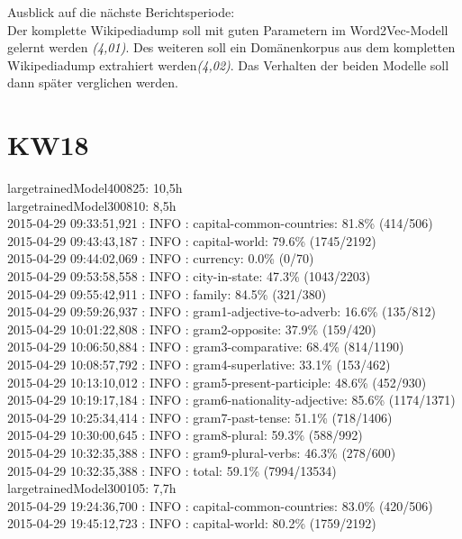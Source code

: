 \documentclass[11pt,a4paper]{article}
\begin{document}
Ausblick auf die nächste Berichtsperiode:
\\Der komplette Wikipediadump soll mit guten Parametern im Word2Vec-Modell gelernt werden \textit{(4,01)}. Des weiteren soll ein Domänenkorpus aus dem kompletten Wikipediadump extrahiert werden\textit{(4,02)}. Das Verhalten der beiden Modelle soll dann später verglichen werden.

\section*{KW18}
largetrainedModel400825: 10,5h
\\largetrainedModel300810: 8,5h
\\2015-04-29 09:33:51,921 : INFO : capital-common-countries: 81.8\% (414/506)
\\2015-04-29 09:43:43,187 : INFO : capital-world: 79.6\% (1745/2192)
\\2015-04-29 09:44:02,069 : INFO : currency: 0.0\% (0/70)
\\2015-04-29 09:53:58,558 : INFO : city-in-state: 47.3\% (1043/2203)
\\2015-04-29 09:55:42,911 : INFO : family: 84.5\% (321/380)
\\2015-04-29 09:59:26,937 : INFO : gram1-adjective-to-adverb: 16.6\% (135/812)
\\2015-04-29 10:01:22,808 : INFO : gram2-opposite: 37.9\% (159/420)
\\2015-04-29 10:06:50,884 : INFO : gram3-comparative: 68.4\% (814/1190)
\\2015-04-29 10:08:57,792 : INFO : gram4-superlative: 33.1\% (153/462)
\\2015-04-29 10:13:10,012 : INFO : gram5-present-participle: 48.6\% (452/930)
\\2015-04-29 10:19:17,184 : INFO : gram6-nationality-adjective: 85.6\% (1174/1371)
\\2015-04-29 10:25:34,414 : INFO : gram7-past-tense: 51.1\% (718/1406)
\\2015-04-29 10:30:00,645 : INFO : gram8-plural: 59.3\% (588/992)
\\2015-04-29 10:32:35,388 : INFO : gram9-plural-verbs: 46.3\% (278/600)
\\2015-04-29 10:32:35,388 : INFO : total: 59.1\% (7994/13534)
\\largetrainedModel300105: 7,7h
\\2015-04-29 19:24:36,700 : INFO : capital-common-countries: 83.0\% (420/506)
\\2015-04-29 19:45:12,723 : INFO : capital-world: 80.2\% (1759/2192)
\end{document}
